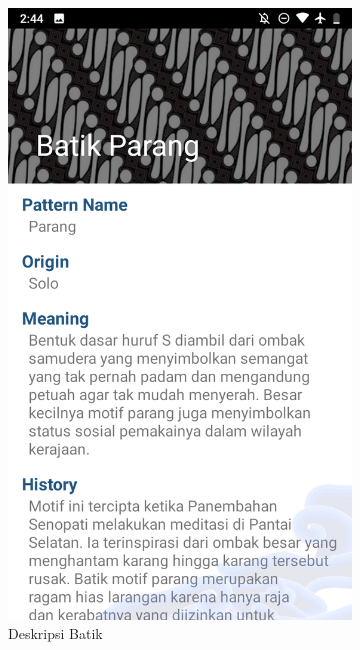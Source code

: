 \begin{figure}[hpt!]
\begin{subfigure}[b]{0.3\textwidth}
      \centering
      
      \includegraphics[width=\textwidth]{gambar/tiga.png}
      
      \caption{Deskripsi Batik}
      
      \label{fig:tiga}
    \end{subfigure}
    \\
    \begin{subfigure}[b]{0.3\textwidth}
      

\end{subfigure}
\end{figure}
